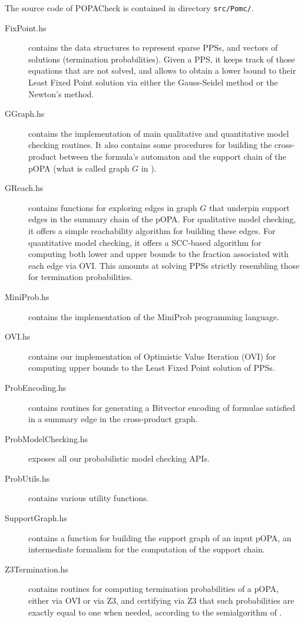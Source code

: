 \documentclass[9pt,a4paper]{article}
\begin{document}
The source code of POPACheck is contained in directory \texttt{src/Pomc/}.
\begin{description}
\item[FixPoint.hs] contains the data structures to represent sparse PPSs, and vectors of solutions (termination probabilities). Given a PPS, it keeps track of those equations that are not solved, and allows to obtain a lower bound to their Least Fixed Point solution via either the Gauss-Seidel method or the Newton's method.
\item[GGraph.hs]  contains the implementation of main qualitative and quantitative model checking routines. It also contains some procedures for building the cross-product between the formula's automaton and the support chain of the pOPA (what is called graph $G$ in \cite{abs-2404-03515}).
\item[GReach.hs] contains functions for exploring edges in graph $G$ that underpin support edges in the summary chain of the pOPA. For qualitative model checking, it offers a simple reachability algorithm for building these edges. For quantitative model checking, it offers a SCC-based algorithm for computing both lower and upper bounds to the fraction associated with each edge via OVI. This amounts at solving PPSs strictly resembling those for termination probabilities.
\item[MiniProb.hs] contains the implementation of the MiniProb programming language.
\item[OVI.hs] contains our implementation of Optimistic Value Iteration (OVI) for computing upper bounds to the Least Fixed Point solution of PPSs.
\item[ProbEncoding.hs] contains routines for generating a Bitvector encoding of formulae satisfied in a summary edge in the cross-product graph.
\item[ProbModelChecking.hs] exposes all our probabilistic model checking APIs.
\item[ProbUtils.hs] contains various utility functions.
\item[SupportGraph.hs] contains a function for building the support graph of an input pOPA, an intermediate formalism for the computation of the support chain.
\item[Z3Termination.hs] contains routines for computing termination probabilities of a pOPA, either via OVI or via Z3, and certifying via Z3 that such probabilities are exactly equal to one when needed, according to the semialgorithm of \cite{POPACheck}.
\end{description}
\end{document}
